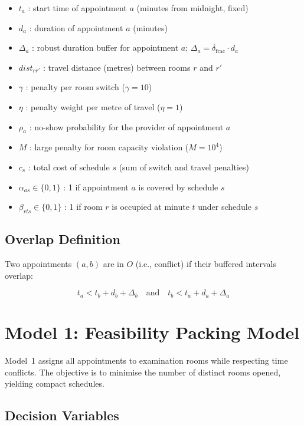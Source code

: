 \documentclass[12pt]{article}
\begin{document}
\begin{itemize}
\item $t_a$ : start time of appointment $a$ (minutes from midnight, fixed)
\item $d_a$ : duration of appointment $a$ (minutes)
\item $\Delta_a$ : robust duration buffer for appointment $a$; $\Delta_a = \delta_{\mathrm{frac}} \cdot d_a$
\item $dist_{rr'}$ : travel distance (metres) between rooms $r$ and $r'$
\item $\gamma$ : penalty per room switch ($\gamma = 10$)
\item $\eta$ : penalty weight per metre of travel ($\eta = 1$)
\item $\rho_a$ : no-show probability for the provider of appointment $a$
\item $M$ : large penalty for room capacity violation ($M = 10^{4}$)
\item $c_s$ : total cost of schedule $s$ (sum of switch and travel penalties)
\item $\alpha_{as} \in \{0,1\}$ : 1 if appointment $a$ is covered by schedule $s$
\item $\beta_{rts} \in \{0,1\}$ : 1 if room $r$ is occupied at minute $t$ under schedule $s$
\end{itemize}

\subsection*{Overlap Definition}

Two appointments $(a,b)$ are in $O$ (i.e., conflict) if their buffered intervals overlap:

\[
t_a < t_b + d_b + \Delta_b \quad \text{and} \quad t_b < t_a + d_a + \Delta_a
\]

\newpage

\section{Model 1: Feasibility Packing Model}

Model~1 assigns all appointments to examination rooms while respecting time conflicts.
The objective is to minimise the number of distinct rooms opened, yielding compact schedules.

\subsection*{Decision Variables}
\end{document}
